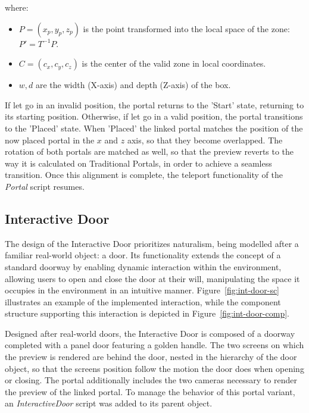 where:
\begin{itemize}
    \item $P = (x_p, y_p, z_p)$ is the point transformed into the local space of the zone: $P' = T^{-1} P$.
    \item $C = (c_x, c_y, c_z)$ is the center of the valid zone in local coordinates.
    \item $w, d$ are the width (X-axis) and depth (Z-axis) of the box.
\end{itemize}

If let go in an invalid position, the portal returns to the 'Start' state, returning to its starting position. Otherwise, if let go in a valid 
position, the portal transitions to the 'Placed' state. When 'Placed' the linked portal matches the position of the now placed portal in the $x$ and 
$z$ axis, so that they become overlapped. The rotation of both portals are matched as well, so that the preview reverts to the way it is calculated on Traditional 
Portals, in order to achieve a seamless transition. Once this alignment is complete, the teleport functionality of the \textit{Portal} script resumes.

\subsection{Interactive Door}
\label{sec:interactive-door}

The design of the Interactive Door prioritizes naturalism, being modelled after a familiar real-world object: a door.
Its functionality extends the concept of a standard doorway by enabling dynamic interaction within the environment, 
allowing users to open and close the door at their will, manipulating the space it occupies in the environment 
in an intuitive manner. Figure~\ref{fig:int-door-sc} 
illustrates an example of the implemented interaction, while the component structure supporting this interaction is depicted 
in Figure~\ref{fig:int-door-comp}.

Designed after real-world doors, the Interactive Door is composed of a doorway completed with a panel door featuring a golden handle. 
The two screens on which the preview is rendered are behind the door, nested in the hierarchy of the door object, so that the screens position follow 
the motion the door does when opening or closing. The portal additionally includes the two cameras necessary to render the preview of the linked portal.
To manage the behavior of this portal variant, an \textit{InteractiveDoor} script was added to its parent object.

